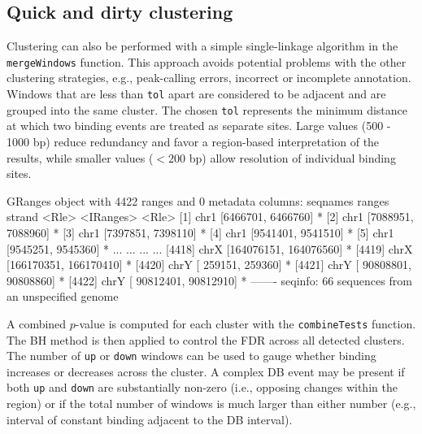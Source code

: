 \documentclass[12pt]{report}
\renewenvironment{Schunk}{\vspace{0pt}}{\vspace{0pt}}
\newcommand{\code}[1]{{\small\texttt{#1}}}
\begin{document}
\subsection{Quick and dirty clustering}
\label{sec:cluster}
Clustering can also be performed with a simple single-linkage algorithm in the \code{mergeWindows} function.
This approach avoids potential problems with the other clustering strategies, e.g., peak-calling errors, incorrect or incomplete annotation. 
Windows that are less than \code{tol} apart are considered to be adjacent and are grouped into the same cluster.
The chosen \code{tol} represents the minimum distance at which two binding events are treated as separate sites.
Large values (500 - 1000 bp) reduce redundancy and favor a region-based interpretation of the results, while smaller values ($< 200$ bp) allow resolution of individual binding sites.

\begin{Schunk}
\begin{Soutput}
GRanges object with 4422 ranges and 0 metadata columns:
         seqnames                 ranges strand
            <Rle>              <IRanges>  <Rle>
     [1]     chr1     [6466701, 6466760]      *
     [2]     chr1     [7088951, 7088960]      *
     [3]     chr1     [7397851, 7398110]      *
     [4]     chr1     [9541401, 9541510]      *
     [5]     chr1     [9545251, 9545360]      *
     ...      ...                    ...    ...
  [4418]     chrX [164076151, 164076560]      *
  [4419]     chrX [166170351, 166170410]      *
  [4420]     chrY [   259151,    259360]      *
  [4421]     chrY [ 90808801,  90808860]      *
  [4422]     chrY [ 90812401,  90812910]      *
  -------
  seqinfo: 66 sequences from an unspecified genome
\end{Soutput}
\end{Schunk}

A combined $p$-value is computed for each cluster with the \code{combineTests} function.
The BH method is then applied to control the FDR across all detected clusters.
The number of \code{up} or \code{down} windows can be used to gauge whether binding increases or decreases across the cluster.
A complex DB event may be present if both \code{up} and \code{down} are substantially non-zero (i.e., opposing changes within the region) or if the total number of windows is much larger than either number (e.g., interval of constant binding adjacent to the DB interval).
\end{document}
